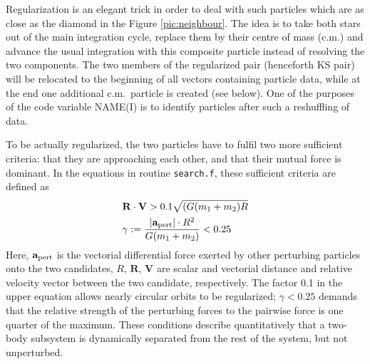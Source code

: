 Regularization is an elegant trick in order to deal with such particles
which are as close as the diamond in the Figure \ref{pic:neighbour}.
The idea is to take both stars out of the main integration cycle,
replace them by their centre of mass (c.m.) and advance the
usual integration with this composite particle instead of
resolving the two components.
The two members of the regularized pair (henceforth KS pair)
will be relocated to the beginning of all vectors containing
particle data, while at the end one additional c.m.\ particle is
created (see below).
One of the purposes of the code variable NAME(I) is to identify
particles after such a reshuffling of data.

To be actually regularized, the two particles have to fulfil two
more sufficient criteria: that they are approaching each other,
and that their mutual force is dominant.
In the equations in routine {\tt search.f}, these sufficient criteria
are defined as
%
\begin{eqnarray}
& {\mathbf R}\cdot {\mathbf V} > 0.1 \sqrt{(G(m_1+m_2)R} \nonumber\\
& \gamma := {\vert {\mathbf a}_{\rm pert}\vert \cdot R^2 \over G(m_1+m_2) } < 0.25 \nonumber
\end{eqnarray}
%
Here, ${\mathbf a}_{\rm pert}$ is the vectorial differential force
exerted by other perturbing particles onto the two candidates,
$R$, ${\mathbf R}$, ${\mathbf V}$ are scalar and vectorial distance
and relative velocity vector between the two candidate, respectively.
The factor 0.1 in the upper equation allows nearly circular
orbits to be regularized;
$\gamma < 0.25$ demands that the relative strength of the perturbing
forces to the pairwise force is one quarter of the maximum.
These conditions describe quantitatively that a two-body subsystem
is dynamically separated from the rest of the system, but not
unperturbed.


